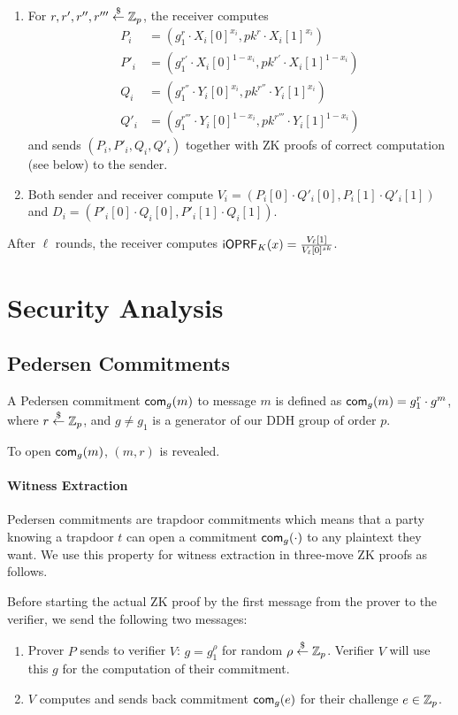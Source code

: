 \begin{enumerate}
\item
  For $r,r',r'',r'''\stackrel{\$}{\leftarrow}\mathbb{Z}_p$, the receiver computes
  \begin{align*}
    P_i&=(g_1^r\cdot{}X_i[0]^{x_i},pk^r\cdot{}X_i[1]^{x_i})
    \\P'_i&=(g_1^{r'}\cdot{}X_i[0]^{1-x_i},pk^{r'}\cdot{}X_i[1]^{1-x_i})
   \\Q_i&=(g_1^{r''}\cdot{}Y_i[0]^{x_i},pk^{r''}\cdot{}Y_i[1]^{x_i})
   \\Q'_i&=(g_1^{r'''}\cdot{}Y_i[0]^{1-x_i},pk^{r'''}\cdot{}Y_i[1]^{1-x_i})
  \end{align*} 
  and sends $(P_i,P'_i,Q_i,Q'_i)$ together with ZK proofs of correct
  computation (see below) to the sender.
\item Both sender and receiver compute
  $V_i=(P_i[0]\cdot{}Q'_i[0],P_i[1]\cdot{}Q'_i[1])$ and
  $D_i=(P'_i[0]\cdot{}Q_i[0],P'_i[1]\cdot{}Q_i[1])$.
  
\end{enumerate}

After $\ell$ rounds, the receiver computes
$\mathsf{i}\mathsf{OPRF}_K(x)=\frac{V_\ell[1]}{V_{\ell}[0]^{sk}}$.


\section{Security Analysis}
\subsection{Pedersen Commitments}
A Pedersen commitment $\mathsf{com}_{g}(m)$ to message $m$ is defined as
$\mathsf{com}_{g}(m)=g_1^r\cdot{}g^m$, where $r\stackrel{\$}{\leftarrow}\mathbb{Z}_p$, and $g\neq{}g_1$ is
a generator of our DDH group of order $p$.

To open $\mathsf{com}_{g}(m)$, $(m,r)$ is revealed.

\paragraph{Witness Extraction}
Pedersen commitments are trapdoor commitments which means that a party
knowing a trapdoor $t$ can open a commitment $\mathsf{com}_g(\cdot)$ to any
plaintext they want.  We use this property for witness extraction in
three-move ZK proofs as follows.

Before starting the actual ZK proof by the first message from the
prover to the verifier, we send the following two messages:
\begin{enumerate}
\item Prover $P$ sends to verifier $V$: $g=g_1^\rho$ for random
  $\rho\stackrel{\$}{\leftarrow}\mathbb{Z}_p$. Verifier $V$ will use this $g$ for the computation
  of their commitment.
  \item $V$ computes and sends back commitment $\mathsf{com}_g(e)$ for their
    challenge $e\in\mathbb{Z}_p$.
\end{enumerate}

